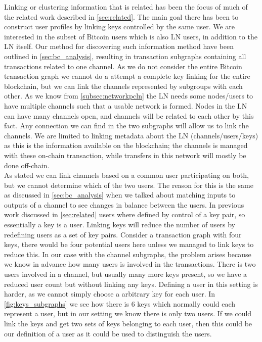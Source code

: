 Linking or clustering information that is related has been the focus of much of the related work described in \cref{sec:related}. The main goal there has been to construct user profiles by linking keys controlled by the same user. We are interested in the subset of Bitcoin users which is also LN users, in addition to the LN itself. 
Our method for discovering such information method have been outlined in \cref{sec:bc_analysis}, resulting in transaction subgraphs containing all transactions related to one channel. As we do not consider the entire Bitcoin transaction graph we cannot do a attempt a complete key linking for the entire blockchain, but we can link the channels represented by subgroups with each other.
As we know from \cref{subsec:networkpcln} the LN needs some nodes/users to have multiple channels such that a usable network is formed. Nodes in the LN can have many channels open, and channels will be related to each other by this fact. Any connection we can find in the two subgraphs will allow us to link the channels.
We are limited to linking metadata about the LN (channels/users/keys) as this is the information available on the blockchain; the channels is managed with these on-chain transaction, while transfers in this network will mostly be done off-chain.
\\

As stated we can link channels based on a common user participating on both, but we cannot determine which of the two users. 
The reason for this is the same as discussed in \cref{sec:bc_analysis} when we talked about matching inputs to outputs of a channel to see changes in balance between the users. 
In previous work discussed in \cref{sec:related} users where defined by control of a key pair, so essentially a key is a user.
Linking keys will reduce the number of users by redefining users as a set of key pairs.
Consider a transaction graph with four keys, there would be four potential users here unless we managed to link keys to reduce this.
In our case with the channel subgraphs, the problem arises because we know in advance how many users is involved in the transactions.
There is two users involved in a channel, but usually many more keys present, so we have a reduced user count but without linking any keys. Defining a user in this setting is harder, as we cannot simply choose a arbitrary key for each user. In \cref{fig:keys_subgraphs} we see how there is 6 keys which normally could each represent a user, but in our setting we know there is only two users. If we could link the keys and get two sets of keys belonging to each user, then this could be our definition of a user as it could be used to distinguish the users. 
\\

